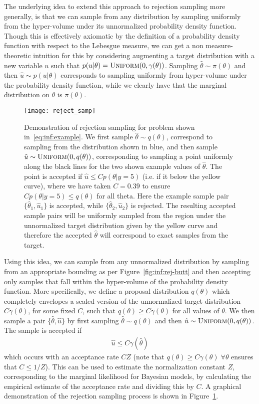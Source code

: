 The underlying idea to extend this approach to rejection sampling more generally, is that we can sample from any distribution
by sampling uniformly from the hyper-volume under its unnormalized probability density function.
Though this is effectively axiomatic by the definition of a probability density
function with respect to the Lebesgue measure, we can get a non measure-theoretic
intuition for this by considering augmenting a target distribution with a new variable $u$
such that $p(u|\theta) = \textsc{Uniform}(0,\gamma(\theta))$.  Sampling 
$\hat{\theta} \sim \pi(\theta)$ and then $\hat{u}\sim p(u|\theta)$ corresponds to
sampling uniformly from hyper-volume under the probability density function, while we
clearly have that the marginal distribution on $\theta$ is $\pi(\theta)$.

\begin{figure}[t]
	\centering
	\texttt{[image: reject\_samp]}
	\caption{Demonstration of rejection sampling for problem shown in~\eqref{eq:inf:example}.  
		We first sample $\hat{\theta}\sim q(\theta)$, correspond to sampling from the distribution
		shown in blue,
		and then sample $\hat{u}\sim \textsc{Uniform}(0,q(\theta))$, corresponding to
		sampling a point uniformly along the black lines for the two shown example values of 
		$\hat{\theta}$.  The point is accepted 
		if $\hat{u} \le C p(\theta | y=5)$ (i.e. if it below the yellow curve), where we have taken
		$C=0.39$ to ensure $C p(\theta | y=5)\le q(\theta)$ for all theta.
		Here the example sample pair $\{\hat{\theta}_1,\hat{u}_1\}$ is accepted, while
		$\{\hat{\theta}_2,\hat{u}_2\}$ is rejected.  The
		resulting accepted sample pairs will be uniformly sampled from the region under
		the unnormalized target distribution given by the yellow curve and therefore
		the accepted $\hat{\theta}$ will correspond to exact samples from the target.
		 \label{fig:inf:rej-samp}}
\end{figure}

Using this idea, we can sample from any unnormalized distribution by sampling from
an appropriate bounding as per Figure~\ref{fig:inf:rej-butt} and then accepting only samples
that fall within the hyper-volume of the probability density function. 
More specifically, we define a proposal
distribution $q(\theta)$ which completely envelopes a
scaled version of the unnormalized target distribution $C\gamma(\theta)$, for some fixed $C$, such that 
$q(\theta)\ge C \gamma(\theta)$ for all values of $\theta$.  We then sample a pair 
$\{\hat{\theta},\hat{u}\}$ by first sampling $\hat{\theta} \sim q(\theta)$ and then
$\hat{u} \sim \textsc{Uniform}(0,q(\theta))$.  The sample is accepted if
\begin{align}
	\label{eq:inf:rej-acc-criteria}
	\hat{u} \le C \gamma(\hat{\theta})
\end{align}
which occurs with an acceptance rate $CZ$ (note that $q(\theta)\ge C \gamma(\theta) \; \forall \theta$
ensures that $C \le 1/Z$).  This can be used to estimate the normalization
constant $Z$, corresponding to the marginal likelihood for Bayesian models, by calculating
the empirical estimate of the acceptance rate and dividing this by $C$.
A graphical demonstration of the rejection sampling process is shown in 
Figure~\ref{fig:inf:rej-samp}.

